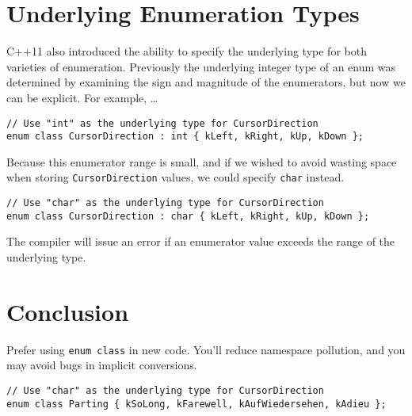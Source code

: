 \section{Underlying Enumeration Types}\label{sec:underlying-enumeration-types}
C++11 also introduced the ability to specify the underlying type for both varieties of enumeration. Previously the underlying integer type of an enum was determined by examining the sign and magnitude of the enumerators, but now we can be explicit. For example, …
\begin{verbatim}
// Use "int" as the underlying type for CursorDirection
enum class CursorDirection : int { kLeft, kRight, kUp, kDown };
\end{verbatim}
Because this enumerator range is small, and if we wished to avoid wasting space when storing \texttt{CursorDirection} values, we could specify \texttt{char} instead.
\begin{verbatim}
// Use "char" as the underlying type for CursorDirection
enum class CursorDirection : char { kLeft, kRight, kUp, kDown };
\end{verbatim}
The compiler will issue an error if an enumerator value exceeds the range of the underlying type.

\section{Conclusion}\label{sec:conclusion2}
Prefer using \texttt{enum class} in new code. You’ll reduce namespace pollution, and you may avoid bugs in implicit conversions.
\begin{verbatim}
// Use "char" as the underlying type for CursorDirection
enum class Parting { kSoLong, kFarewell, kAufWiedersehen, kAdieu };
\end{verbatim}
